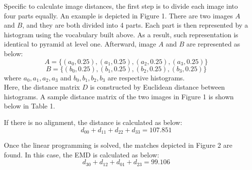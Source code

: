 \noindent Specific to calculate image distances, the first step is to divide each image into four parts equally. An example is depicted in Figure 1. There are two images $A$ and $B$, and they are both divided into 4 parts. Each part is then represented by a histogram using the vocabulary built above. As a result, such representation is identical to pyramid at level one. Afterward, image $A$ and $B$ are represented as below:
	$$A = \{(a_0, 0.25), (a_1, 0.25), (a_2, 0.25), (a_3, 0.25)\}$$
	$$B = \{(b_0, 0.25), (b_1, 0.25), (b_2, 0.25), (b_3, 0.25)\}$$
where $a_0, a_1, a_2, a_3$ and $b_0, b_1, b_2, b_3$ are respective histograms.\\

\noindent Here, the distance matrix $D$ is constructed by Euclidean distance between histograms. A sample distance matrix of the two images in Figure 1 is shown below in Table 1. 

\begin{table}[!ht]
    \begin{center}
    \end{center}
    \caption{Distance matrix}
\end{table}

\noindent If there is no alignment, the distance is calculated as below:
$$d_{00} + d_{11} + d_{22} + d_{33} = 107.851$$

\noindent Once the linear programming is solved, the matches depicted in Figure 2 are found. In this case, the EMD is calculated as below:
$$d_{30} + d_{12} + d_{01} + d_{23} = 99.106$$

